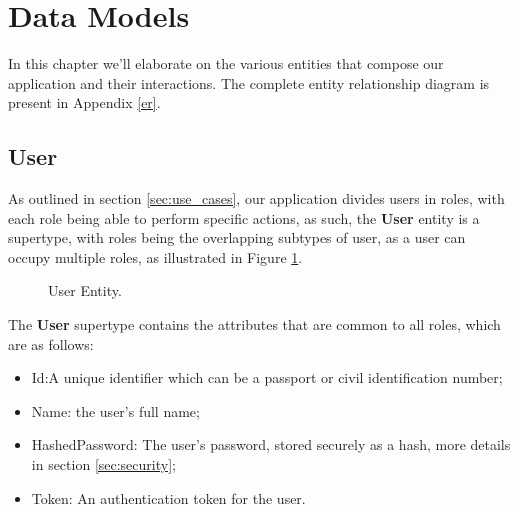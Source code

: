 \section{Data Models}\label{sec:data_models}

In this chapter we'll elaborate on the various entities that compose our application and their interactions.
The complete entity relationship diagram is present in Appendix \ref{er}.

\subsection{User}

As outlined in section \ref{sec:use_cases}, our application divides users in roles, with each role being able to perform specific actions, as such, the \textbf{User} entity is a supertype, with roles being the overlapping subtypes of user, as a user can occupy multiple roles, as illustrated in Figure \ref{fig:user_entity}.

\begin{figure}[H]
	\begin{center}
	\end{center}
	\caption{User Entity.}\label{fig:user_entity}
\end{figure}

The \textbf{User} supertype contains the attributes that are common to all roles, which are as follows:

\begin{itemize}
	\item Id:A unique identifier which can be a passport or civil identification number;
	\item Name: the user's full name;
	\item HashedPassword: The user's password, stored securely as a hash, more details in section \ref{sec:security};
	\item Token: An authentication token for the user.
\end{itemize}

